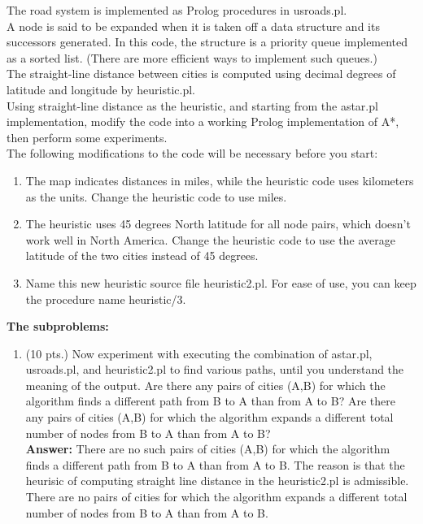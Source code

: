 \documentclass{article}%
\begin{document}
\begin{enumerate}
The road system is implemented as Prolog procedures in usroads.pl. \\
A node is said to be expanded when it is taken off a data structure and its successors generated. In this code, the structure is a priority queue implemented as a sorted list. (There are more efficient ways to implement such queues.) \\
The straight-line distance between cities is computed using decimal degrees of latitude and longitude by heuristic.pl. \\
Using straight-line distance as the heuristic, and starting from the astar.pl implementation, modify the code into a working Prolog implementation of A*, then perform some experiments. \\
The following modifications to the code will be necessary before you start: 
	\begin{enumerate}
  		\item The map indicates distances in miles, while the heuristic code uses kilometers as the units. Change the heuristic code to use miles.
  		\item The heuristic uses 45 degrees North latitude for all node pairs, which doesn't work well in North America. Change the heuristic code to use the average latitude of the two cities instead of 45 degrees.
  		\item Name this new heuristic source file heuristic2.pl. For ease of use, you can keep the procedure name heuristic/3.
	\end{enumerate}
	\textbf{The subproblems: }\\
	\begin{enumerate}
  		\item (10 pts.) Now experiment with executing the combination of astar.pl, usroads.pl, and heuristic2.pl to find various paths, until you understand the meaning of the output. Are there any pairs of cities (A,B) for which the algorithm finds a different path from B to A than from A to B? Are there any pairs of cities (A,B) for which the algorithm expands a different total number of nodes from B to A than from A to B? \\
  		
  		\textbf{Answer:} There are no such pairs of cities (A,B) for which the algorithm finds a different path from B to A than from A to B. The reason is that the heurisic of computing straight line distance in the heuristic2.pl is admissible. There are no pairs of cities for which the algorithm expands a different total number of nodes from B to A than from A to B.
  		

\end{enumerate}
\end{enumerate}
\end{document}
